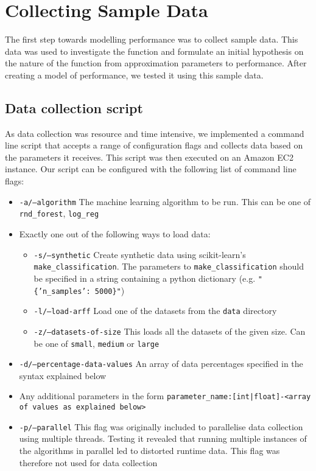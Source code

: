 \documentclass[a4paper,12pt,twoside,openright]{report}
\begin{document}
\section{Collecting Sample Data}
The first step towards modelling performance was to collect sample data. This data was used to investigate the function and formulate an initial hypothesis on the nature of the function from approximation parameters to performance. After creating a model of performance, we tested it using this sample data.

\subsection{Data collection script}
As data collection was resource and time intensive, we implemented a command line script that accepts a range of configuration flags and collects data based on the parameters it receives. This script was then executed on an Amazon EC2 instance. Our script can be configured with the following list of command line flags:

\begin{itemize}
\item \texttt{-a/--algorithm} The machine learning algorithm to be run. This can be one of \texttt{rnd\_forest}, \texttt{log\_reg}
\item Exactly one out of the following ways to load data:
\begin{itemize}[label=$\star$]
        \item \texttt{-s/--synthetic} Create synthetic data using scikit-learn's \texttt{make\_classification}. The parameters to \texttt{make\_classification} should be specified in a string containing a python dictionary (e.g. \texttt{"\{'n\_samples': 5000\}"})
        \item \texttt{-l/--load-arff} Load one of the datasets from the \texttt{data} directory
        \item \texttt{-z/--datasets-of-size} This loads all the datasets of the given size. Can be one of \texttt{small}, \texttt{medium} or \texttt{large}
     \end{itemize}
\item \texttt{-d/--percentage-data-values} An array of data percentages specified in the syntax explained below
\item Any additional parameters in the form \texttt{parameter\_name:[int|float]-<array of values as explained below>}
\item \texttt{-p/--parallel} This flag was originally included to parallelise data collection using multiple threads. Testing it revealed that running multiple instances of the algorithms in parallel led to distorted runtime data. This flag was therefore not used for data collection
\end{itemize}
\end{document}
